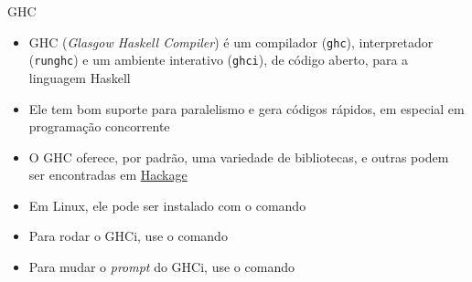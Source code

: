 \begin{frame}[fragile]{GHC}

    \begin{itemize}
        \item GHC (\textit{Glasgow Haskell Compiler}) é um compilador (\texttt{ghc}),
            interpretador (\texttt{runghc}) e um ambiente interativo (\texttt{ghci}), de 
            código aberto, para a linguagem Haskell

        \item Ele tem bom suporte para paralelismo e gera códigos rápidos, em especial em
            programação concorrente

        \item O GHC oferece, por padrão, uma variedade de bibliotecas, e outras podem ser 
            encontradas em \href{https://hackage.haskell.org/}{Hackage}
 
        \item Em Linux, ele pode ser instalado com o comando


        \item Para rodar o GHCi, use o comando


        \item Para mudar o \textit{prompt} do GHCi, use o comando 


    \end{itemize}

\end{frame}
